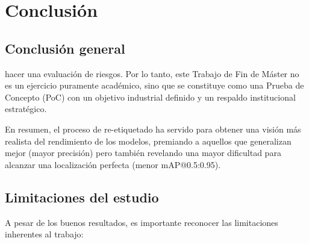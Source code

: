 \documentclass[12pt,a4paper,onecolumn,oneside]{report}
\begin{document}
\chapter{Conclusión} %


\section{Conclusión general}
\label{sec:Conclusión general}

hacer una evaluación de riesgos.
Por lo tanto, este Trabajo de Fin de Máster no es un ejercicio puramente académico, sino que se constituye como una Prueba de Concepto (PoC) con un objetivo industrial definido y un respaldo institucional estratégico.

En resumen, el proceso de re-etiquetado ha servido para obtener una visión más realista del rendimiento de los modelos, premiando a aquellos que generalizan mejor (mayor precisión) pero también revelando una mayor dificultad para alcanzar una localización perfecta (menor mAP@0.5:0.95).


\section{Limitaciones del estudio}
\label{sec:Limitaciones del estudio}

A pesar de los buenos resultados, es importante reconocer las limitaciones inherentes al trabajo:
\end{document}
